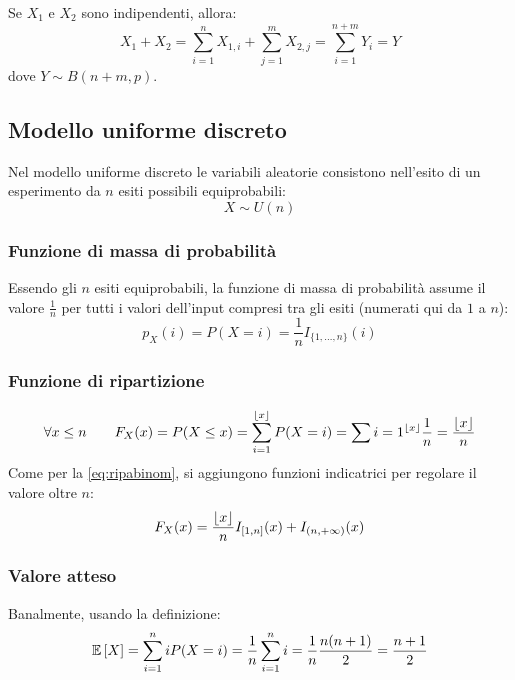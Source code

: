 \noindent
Se $X_1$ e $X_2$ sono indipendenti, allora:
\begin{equation*}
	X_1+X_2 = \sum_{i=1}^n X_{1,i} + \sum_{j=1}^m X_{2,j} = \sum_{i=1}^{n+m} Y_i = Y
\end{equation*}
dove $Y\sim B(n+m, p)$.



\subsection{Modello uniforme discreto} \label{subsec:unifdisc}
Nel modello uniforme discreto le variabili aleatorie consistono nell'esito di un esperimento da $n$ esiti possibili equiprobabili:
\begin{equation*}
	X\sim U(n)
\end{equation*}


\subsubsection{Funzione di massa di probabilità}
Essendo gli $n$ esiti equiprobabili, la funzione di massa di probabilità assume il valore $\frac{1}{n}$ per tutti i valori dell'input compresi tra gli esiti (numerati qui da $1$ a $n$):
\begin{equation*}
	p_X(i) = P(X=i) = \frac{1}{n} I_{\{1,\dots,n\}}(i)
\end{equation*}


\subsubsection{Funzione di ripartizione}
\begin{equation*}
	\forall x\leq n\qquad F_X(x) = P(X\leq x) = \sum_{i=1}^{\left\lfloor x \right\rfloor} P(X=i) = \sum{i=1}^{\left\lfloor x \right\rfloor} \frac{1}{n} = \frac{\left\lfloor x \right\rfloor}{n}
\end{equation*}
Come per la \eqref{eq:ripabinom}, si aggiungono funzioni indicatrici per regolare il valore oltre $n$:
\begin{equation}
	F_X(x)=\frac{\left\lfloor x \right\rfloor}{n} I_{[1,n]}(x)+I_{(n,+\infty)}(x)
\end{equation}


\subsubsection{Valore atteso}
Banalmente, usando la definizione:
\begin{equation} \label{eq:disunvalat}
	\mathbb{E}\left[ X \right] = \sum_{i=1}^n i P(X=i) = \frac{1}{n} \sum_{i=1}^n i = \frac{1}{n}\frac{n(n+1)}{2} = \frac{n+1}{2}
\end{equation}


